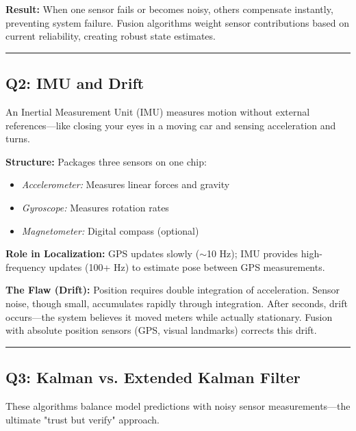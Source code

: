 \documentclass[12pt,a4paper]{article}
\begin{document}
\noindent\textbf{Result:} When one sensor fails or becomes noisy, others compensate instantly, preventing system failure. Fusion algorithms weight sensor contributions based on current reliability, creating robust state estimates.

\vspace{0.3em}
\noindent\rule{\textwidth}{0.4pt}
\vspace{0.3em}

\subsection{Q2: IMU and Drift}

An Inertial Measurement Unit (IMU) measures motion without external references—like closing your eyes in a moving car and sensing acceleration and turns.

\noindent\textbf{Structure:} Packages three sensors on one chip:
\begin{itemize}[leftmargin=*]
    \item \textit{Accelerometer:} Measures linear forces and gravity
    \item \textit{Gyroscope:} Measures rotation rates
    \item \textit{Magnetometer:} Digital compass (optional)
\end{itemize}

\noindent\textbf{Role in Localization:} GPS updates slowly ($\sim$10 Hz); IMU provides high-frequency updates (100+ Hz) to estimate pose between GPS measurements.

\noindent\textbf{The Flaw (Drift):} Position requires double integration of acceleration. Sensor noise, though small, accumulates rapidly through integration. After seconds, drift occurs—the system believes it moved meters while actually stationary. Fusion with absolute position sensors (GPS, visual landmarks) corrects this drift.

\vspace{0.3em}
\noindent\rule{\textwidth}{0.4pt}
\vspace{0.3em}

\subsection{Q3: Kalman vs. Extended Kalman Filter}

These algorithms balance model predictions with noisy sensor measurements—the ultimate "trust but verify" approach.
\end{document}
